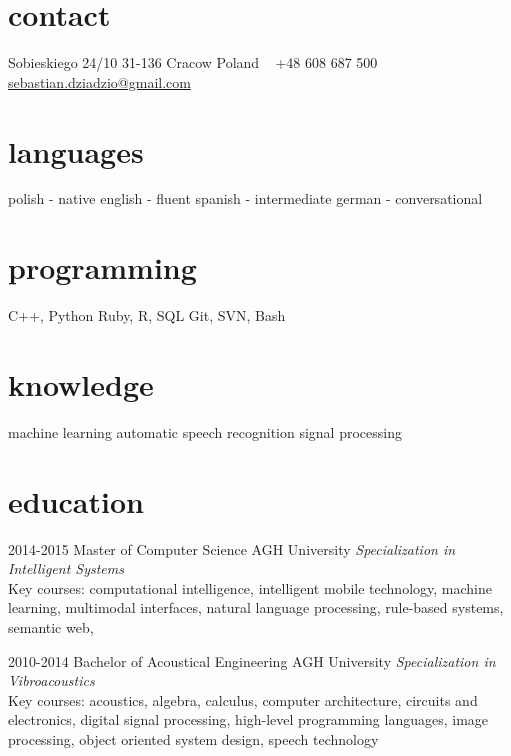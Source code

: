 \documentclass[]{friggeri-cv} %
\begin{document}


\begin{aside} %
\section{contact}
Sobieskiego 24/10
31-136 Cracow
Poland
~
+48 608 687 500
~
\href{mailto:sebastian.dziadzio@gmail.com}{sebastian.dziadzio@gmail.com}
\href{http://pl.linkedin.com/in/sebastiandziadzio}{\color{gray} \faLinkedinSign} \href{https://github.com/sebastiandziadzio}{\color{gray} \faGithubSign} \href{https://twitter.com/sebadzia}{\color{gray} \faTwitterSign}
\section{languages}
polish - native
english - fluent
spanish - intermediate
german - conversational
\section{programming}
C++, Python
Ruby, R, SQL
Git, SVN, Bash
\section{knowledge}
machine learning
automatic speech recognition
signal processing
\end{aside}


\section{education}

\begin{entrylist}

\entry
{2014-2015}
{Master of Computer Science}
{AGH University}
{\emph{Specialization in Intelligent Systems} \\ Key courses: computational intelligence, intelligent mobile technology, machine learning, multimodal interfaces, natural language processing, rule-based systems, semantic web, }

\entry
{2010-2014}
{Bachelor of Acoustical Engineering}
{AGH University}
{\emph{Specialization in Vibroacoustics} \\ Key courses: acoustics, algebra, calculus, computer architecture, circuits and electronics, digital signal processing, high-level programming languages, image processing, object oriented system design, speech technology}
\end{entrylist}
\end{document}

